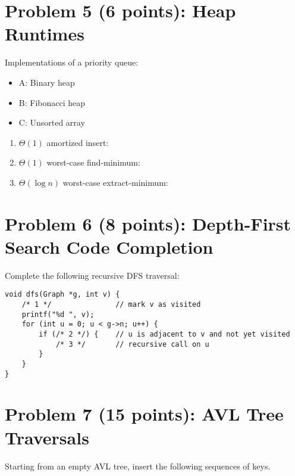 \documentclass[12pt]{article}
\begin{document}
\newpage

\section*{Problem 5 (6 points): Heap Runtimes}
Implementations of a priority queue:
\begin{itemize}
\item A: Binary heap
\item B: Fibonacci heap
\item C: Unsorted array
\end{itemize}

\begin{enumerate}
\item $\Theta(1)$ amortized insert: \underline{\hspace{1in}}
\item $\Theta(1)$ worst-case find-minimum: \underline{\hspace{1in}}
\item $\Theta(\log n)$ worst-case extract-minimum: \underline{\hspace{1in}}
\end{enumerate}

\newpage

\section*{Problem 6 (8 points): Depth-First Search Code Completion}
Complete the following recursive DFS traversal:

\begin{verbatim}
void dfs(Graph *g, int v) {
    /* 1 */               // mark v as visited
    printf("%d ", v);
    for (int u = 0; u < g->n; u++) {
        if (/* 2 */) {    // u is adjacent to v and not yet visited
            /* 3 */       // recursive call on u
        }
    }
}
\end{verbatim}

\newpage

\section*{Problem 7 (15 points): AVL Tree Traversals}
Starting from an empty AVL tree, insert the following sequences of keys.
\end{document}
